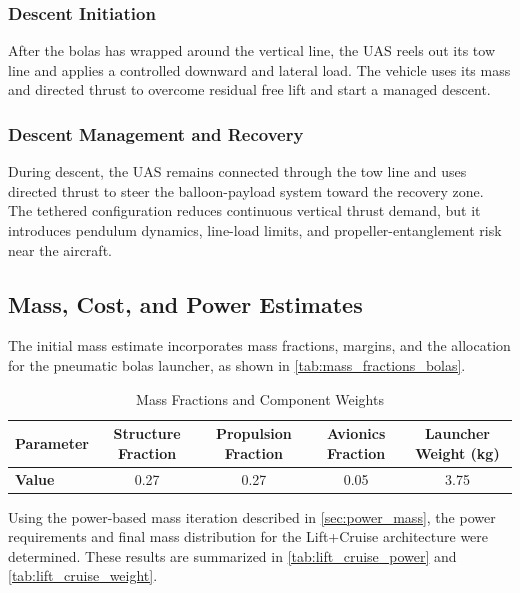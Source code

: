 \subsubsection{Descent Initiation}
After the bolas has wrapped around the vertical line, the UAS reels out
its tow line and applies a controlled downward and lateral load. The
vehicle uses its mass and directed thrust to overcome residual free lift
and start a managed descent.

\subsubsection{Descent Management and Recovery}
During descent, the UAS remains connected through the tow line and uses
directed thrust to steer the balloon-payload system toward the recovery
zone. The tethered configuration reduces continuous vertical thrust
demand, but it introduces pendulum dynamics, line-load limits, and
propeller-entanglement risk near the aircraft.

\subsection{Mass, Cost, and Power Estimates}
The initial mass estimate incorporates mass fractions, margins, and the allocation for the pneumatic bolas launcher, as shown in \autoref{tab:mass_fractions_bolas}.

\begin{table}[htbp]
\centering
\caption{Mass Fractions and Component Weights}
\label{tab:mass_fractions_bolas}
\begin{tabular}{lcccc}
\toprule
\textbf{Parameter} & Structure Fraction & Propulsion Fraction & Avionics Fraction & Launcher Weight (kg) \\
\midrule
\textbf{Value} & 0.27 & 0.27 & 0.05 & 3.75 \\
\bottomrule
\end{tabular}
\end{table}

Using the power-based mass iteration described in \autoref{sec:power_mass}, the power requirements and final mass distribution for the Lift+Cruise architecture were determined. These results are summarized in \autoref{tab:lift_cruise_power} and \autoref{tab:lift_cruise_weight}.

